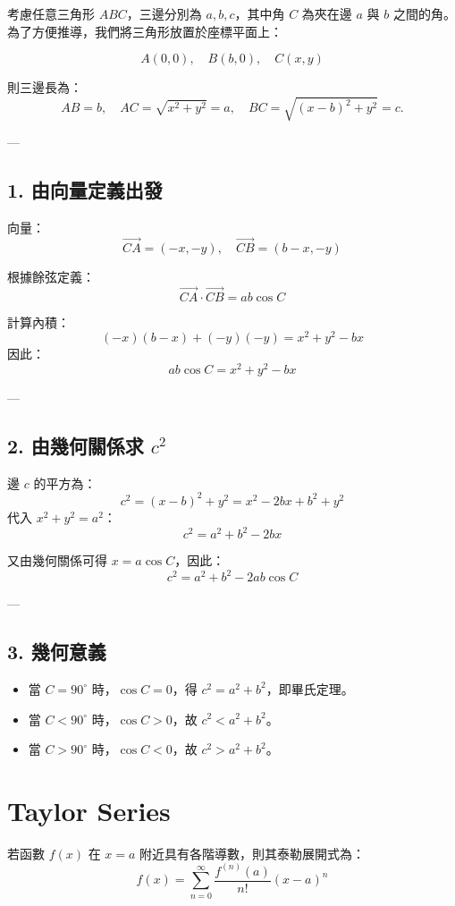 \documentclass{article}
\begin{document}
考慮任意三角形 $ABC$，三邊分別為 $a, b, c$，其中角 $C$ 為夾在邊 $a$ 與 $b$ 之間的角。  
為了方便推導，我們將三角形放置於座標平面上：

\[
A(0,0), \quad B(b,0), \quad C(x,y)
\]

則三邊長為：
\[
AB = b, \quad AC = \sqrt{x^2 + y^2} = a, \quad BC = \sqrt{(x-b)^2 + y^2} = c.
\]

---

\subsection*{1. 由向量定義出發}

向量：
\[
\overrightarrow{CA} = (-x, -y), \quad
\overrightarrow{CB} = (b - x, -y)
\]

根據餘弦定義：
\[
\overrightarrow{CA} \cdot \overrightarrow{CB} = ab\cos C
\]

計算內積：
\[
(-x)(b - x) + (-y)(-y) = x^2 + y^2 - bx
\]
因此：
\[
ab\cos C = x^2 + y^2 - bx
\]

---

\subsection*{2. 由幾何關係求 $c^2$}

邊 $c$ 的平方為：
\[
c^2 = (x - b)^2 + y^2 = x^2 - 2bx + b^2 + y^2
\]
代入 $x^2 + y^2 = a^2$：
\[
c^2 = a^2 + b^2 - 2bx
\]

又由幾何關係可得 $x = a\cos C$，因此：
\[
\boxed{
c^2 = a^2 + b^2 - 2ab\cos C
}
\]

---

\subsection*{3. 幾何意義}

\begin{itemize}
  \item 當 $C = 90^\circ$ 時，$\cos C = 0$，得 $c^2 = a^2 + b^2$，即畢氏定理。
  \item 當 $C < 90^\circ$ 時，$\cos C > 0$，故 $c^2 < a^2 + b^2$。
  \item 當 $C > 90^\circ$ 時，$\cos C < 0$，故 $c^2 > a^2 + b^2$。
\end{itemize}
\section*{Taylor Series}

若函數 $f(x)$ 在 $x=a$ 附近具有各階導數，則其泰勒展開式為：
\[
f(x) = \sum_{n=0}^{\infty} \frac{f^{(n)}(a)}{n!}(x - a)^n
\]
\end{document}

